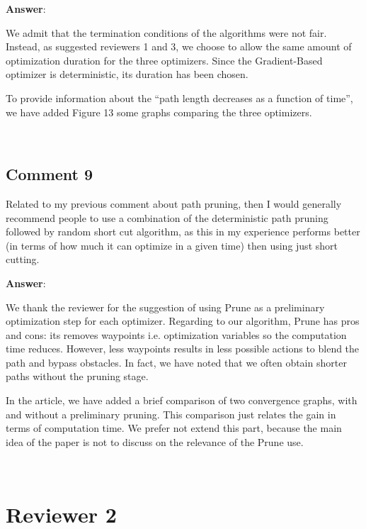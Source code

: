 \documentclass{scrartcl}
\begin{document}
\vspace{0.5cm}

\textbf{Answer}:

We admit that the termination conditions of the algorithms were not fair. Instead, as suggested reviewers 1 and 3, we choose to allow the same amount of optimization duration for the three optimizers. Since the Gradient-Based optimizer is deterministic, its duration has been chosen.

To provide information about the ``path length decreases as a function of time'', we have added Figure 13 some graphs comparing the three optimizers.

\noindent
\hrulefill\\

\subsection{Comment 9}

Related to my previous comment about path pruning, then I would generally recommend people to use a combination of the deterministic path pruning followed by random short cut algorithm, as this in my experience performs better (in terms of how much it can optimize in a given time) then using just short cutting.

\vspace{0.5cm}

\textbf{Answer}:

We thank the reviewer for the suggestion of using Prune as a preliminary optimization step for each optimizer. Regarding to our algorithm, Prune has pros and cons: its removes waypoints i.e. optimization variables so the computation time reduces. However, less waypoints results in less possible actions to blend the path and bypass obstacles. In fact, we have noted that we often obtain shorter paths without the pruning stage.

In the article, we have added a brief comparison of two convergence graphs, with and without a preliminary pruning. This comparison just relates the gain in terms of computation time. We prefer not extend this part, because the main idea of the paper is not to discuss on the relevance of the Prune use.

\noindent
\hrulefill\\

\section{Reviewer 2}
\end{document}
